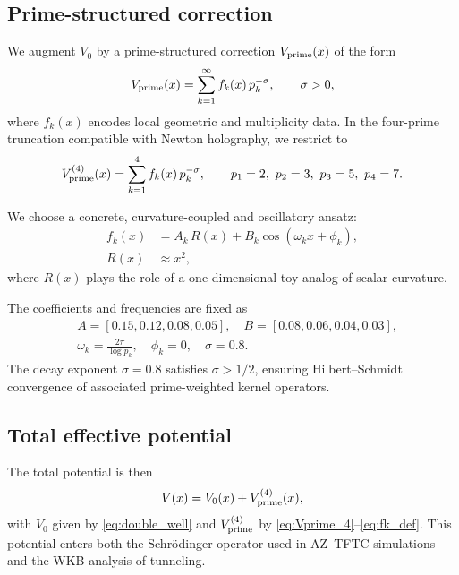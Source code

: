 \documentclass[11pt]{article}
\begin{document}
\subsection{Prime-structured correction}

We augment \(V_0\) by a prime-structured correction
\(V_{\rm prime}(x)\) of the form
\begin{equation}
  V_{\rm prime}(x) = \sum_{k=1}^\infty f_k(x)\,p_k^{-\sigma},
  \qquad \sigma>0,
  \label{eq:Vprime_general}
\end{equation}
where \(f_k(x)\) encodes local geometric and multiplicity data.\cite{tunneling_topology_draft}
In the four-prime truncation compatible with Newton holography, we
restrict to
\begin{equation}
  V_{\rm prime}^{(4)}(x) = \sum_{k=1}^{4} f_k(x)\,p_k^{-\sigma},
  \qquad p_1=2,\ p_2=3,\ p_3=5,\ p_4=7.
  \label{eq:Vprime_4}
\end{equation}

We choose a concrete, curvature-coupled and oscillatory ansatz:
\begin{align}
  f_k(x) &= A_k\,R(x) + B_k \cos(\omega_k x + \phi_k),
  \label{eq:fk_def} \\
  R(x) &\approx x^2,
\end{align}
where \(R(x)\) plays the role of a one-dimensional toy analog of scalar
curvature.\cite{tunneling_topology_draft}

The coefficients and frequencies are fixed as
\begin{align}
  &A = [0.15, 0.12, 0.08, 0.05],\quad
    B = [0.08, 0.06, 0.04, 0.03],\nonumber\\
  &\omega_k = \frac{2\pi}{\log p_k},\quad
    \phi_k = 0,\quad \sigma = 0.8.
\end{align}
The decay exponent \(\sigma=0.8\) satisfies \(\sigma>1/2\), ensuring
Hilbert--Schmidt convergence of associated prime-weighted kernel
operators.\cite{tunneling_topology_draft}

\subsection{Total effective potential}

The total potential is then
\begin{equation}
  V(x) = V_0(x) + V_{\rm prime}^{(4)}(x),
  \label{eq:V_total}
\end{equation}
with \(V_0\) given by \eqref{eq:double_well} and
\(V_{\rm prime}^{(4)}\) by \eqref{eq:Vprime_4}--\eqref{eq:fk_def}. This
potential enters both the Schr\"odinger operator used in AZ--TFTC
simulations and the WKB analysis of tunneling.
\end{document}
